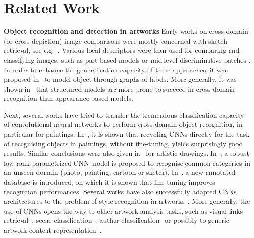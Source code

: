 \documentclass[runningheads]{llncs}
\begin{document}
\section{Related Work}

\textbf{Object recognition and detection in artworks}
Early works on cross-domain (or cross-depiction) image comparisons were mostly concerned with sketch retrieval, see e.g.~\cite{del1997visual}. Various local descriptors were then used for comparing and classifying images, such as
part-based models \cite{shrivastava2011data} or mid-level discriminative patches \cite{aubry2014painting,crowley2014state}. In order to enhance the generalisation capacity of these approaches, it was proposed in~\cite{wu2014learning} to model object through graphs of labels. More generally, it was shown in~\cite{hall2015cross} that structured models are more prone to succeed in cross-domain recognition than appearance-based models. 

Next, several works have tried to transfer the tremendous classification capacity of convolutional neural networks to perform cross-domain object recognition, in particular for paintings. In~\cite{crowley_search_2014}, it is shown that recycling CNNs directly for the task of recognising objects in paintings, without fine-tuning, yields surprisingly good results. Similar conclusions were also given in~\cite{yin2016object} for artistic drawings. In~\cite{li_deeper_2017}, a robust low rank parametrized CNN model is proposed to recognise common categories in an unseen domain (photo, painting, cartoon or sketch).
In~\cite{wilber_bam_2017}, a new annotated database is introduced, on which it is shown that fine-tuning improves recognition performances. Several works have also successfully adapted CNNs architectures to the problem of style recognition in artworks~\cite{lecoutre_recognizing_2017,bianco2017deep,mao_deepart_2017}. More generally, the use of CNNs opens the way to other artwork analysis tasks, such as  visual links retrieval~\cite{seguin_visual_2016}, scene classification~\cite{florea_domain_2017}, author classification~\cite{vannoord_learning_2017} or possibly to generic artwork content representation~\cite{strezoski_omniart_2017}. 
\end{document}
